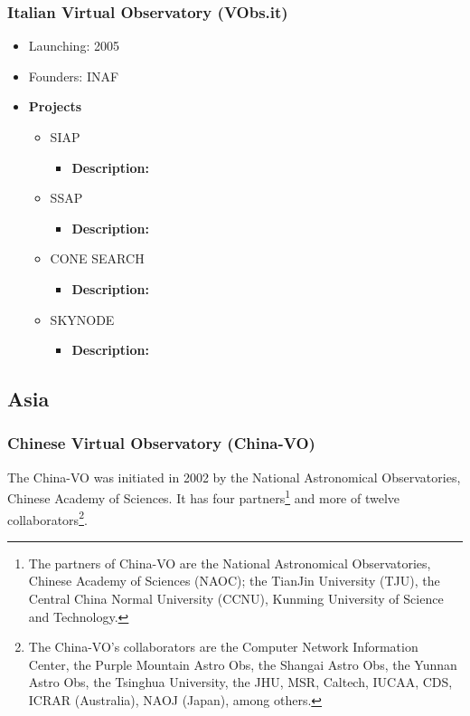 \documentclass[11pt]{article}
\begin{document}
            \subsubsection{Italian Virtual Observatory (VObs.it)}
                \begin{itemize}
                    \item Launching: 2005
                    \item Founders: INAF
                    \item \textbf{Projects}
                        \begin{itemize}
                            \item SIAP
                                \begin{itemize}
                                    \item \textbf{Description:} 
                                \end{itemize}
                            \item SSAP
                                \begin{itemize}
                                    \item \textbf{Description:} 
                                \end{itemize}
                            \item CONE SEARCH
                                \begin{itemize}
                                    \item \textbf{Description:} 
                                \end{itemize}
                            \item SKYNODE
                                \begin{itemize}
                                    \item \textbf{Description:} 
                                \end{itemize}
                        \end{itemize}
                \end{itemize}

        \subsection{Asia}
            \subsubsection{Chinese Virtual Observatory (China-VO)}
                The China-VO was initiated in 2002 by the National Astronomical
Observatories, Chinese Academy of Sciences. It has four partners\footnote{The
partners of China-VO are the National Astronomical Observatories, Chinese
Academy of Sciences (NAOC); the TianJin University (TJU), the Central China
Normal University (CCNU), Kunming University of Science and Technology.} and
more of twelve collaborators\footnote{The China-VO's collaborators are the
Computer Network Information Center, the Purple Mountain Astro Obs, the Shangai
Astro Obs, the Yunnan Astro Obs, the Tsinghua University, the JHU, MSR, Caltech,
IUCAA, CDS, ICRAR (Australia), NAOJ (Japan), among others.}.
\end{document}
